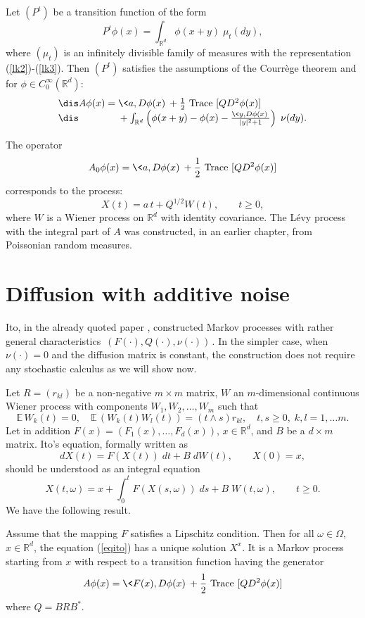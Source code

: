 \documentclass[preprint]{imsart}
\def\E{\mathbb E}
\def\R{\mathbb R}
\begin{document}
{\begin{Theorem}
  Let $(P^t)$ be a transition function of the form
$$
P^t\phi(x)= \int_{\R^d} \phi(x+y)\; \mu_t(dy),
$$
where $(\mu_t)$ is an infinitely divisible family of measures with
the representation (\ref{lk2})-(\ref{lk3}). Then
$(P^t)$ satisfies the assumptions of the Courr\`ege theorem and
for $\phi\in C_0^\infty (\R^d)$:
$$\begin{array}{l}\dis
 A\phi(x)= \<a,D\phi(x)\> +\frac{1}{2}{\rm \ Trace}\
 [QD^2\phi(x)]
 \\\dis
 \qquad\qquad+ \int_{\R^d} \left(
 \phi(x+y)-\phi(x)-\frac{\<y,D\phi(x)\>}{|y|^2+ 1}
 \right)\; \nu(dy).
 \end{array}
 $$
\end{Theorem}
The operator
$$
 A_0\phi(x)= \<a,D\phi(x)\> +\frac{1}{2}{\rm \ Trace}\
 [QD^2\phi(x)]
 $$
corresponds to the  process:
$$
X(t) = a\, t + Q^{1/2}W(t),\qquad t\ge 0,
$$
where $W$ is a Wiener process on $\R^d$ with identity covariance.
The L\'evy process with the integral part of $A$ was constructed,
in an earlier chapter, from  Poissonian random measures.

\section{Diffusion with additive noise}
Ito, in the already quoted paper \cite{ito}, constructed Markov processes with
rather general  characteristics $\,(F(\cdot),Q(\cdot),\nu(\cdot))\,$. In the simpler case,
when $\nu(\cdot)=0$ and the diffusion matrix is constant, the construction
does not require any stochastic calculus as we will show now.

Let $R=(r_{kl})$ be a non-negative $m\times m$ matrix, $W$ an
$m$-dimensional continuous Wiener process with components
$W_1,W_2,\ldots ,W_m$ such that
$$
\E\, W_k(t)=0,\quad
\E\,( W_k(t)W_l(t))=(t\wedge s)r_{kl},\quad
t,s\ge 0,\; k,l=1,\ldots m.
$$
Let in addition $F(x)=(F_1(x),\ldots ,F_d(x))$, $x\in\R^d$, and
$B$ be a $d\times m$ matrix.
Ito's equation, formally written as
$$
dX(t)=F(X(t))\; dt+ B\;dW(t),\qquad X(0)=x,
$$
should be understood as an integral equation
\begin{equation}\label{eqito}
  X(t,\omega)=x+\int_0^t
  F(X(s,\omega))\; ds+ B\;W(t,\omega),\qquad t\ge0.
\end{equation}
We have the following result.

\begin{Theorem}
  Assume that the mapping $F$ satisfies a Lipschitz condition.
  Then for all $\omega\in\Omega$, $x\in\R^d$, the equation
  (\ref{eqito}) has a unique solution $X^x$. It is a Markov
  process starting from $x$ with respect to a transition function
  having the generator
\begin{equation}\label{genaddnoise}
 A\phi(x)= \<F(x),D\phi(x)\> +\frac{1}{2}{\rm \ Trace}\
 [QD^2\phi(x)]
\end{equation}
 where $Q=BRB^*$.
\end{Theorem}

}
\end{document}
